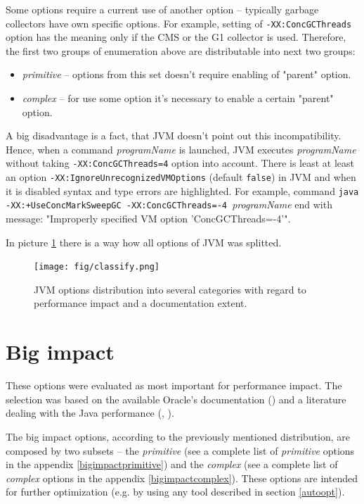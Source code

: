 \documentclass[
  digital, %
  oneside,
  notable, %
  nolof,     %
  nolot     %
]{fithesis3}
\begin{document}
Some options require a current use of another option -- typically garbage collectors have own specific options. For example, setting of \texttt{-XX:ConcGCThreads} option has the meaning only if the CMS or the G1 collector is used. Therefore, the first two groups of enumeration above are distributable into next two groups:
\begin{itemize}
	\item \textit{primitive} -- options from this set doesn't require enabling of "parent" option.
	\item \textit{complex} -- for use some option it's necessary to enable a certain "parent" option.
\end{itemize}
A big disadvantage is a fact, that JVM doesn't point out this incompatibility. Hence, when a command \texttt{} \textit{programName} is launched, JVM executes \textit{programName} without taking \texttt{-XX:ConcGCThreads=4} option into account. There is least at least an option \texttt{-XX:IgnoreUnrecognizedVMOptions} (default \texttt{false}) in JVM and when it is disabled syntax and type errors are highlighted. For example, command \texttt{java -XX:+UseConcMarkSweepGC -XX:ConcGCThreads=-4 }\textit{programName} end with message: "Improperly specified VM option 'ConcGCThreads=-4'".

In picture \ref{classify} there is a way how all options of JVM was splitted.

\begin{figure}[h]
	\centering
	\texttt{[image: fig/classify.png]}
	\caption{JVM options distribution into several categories with regard to performance impact and a documentation extent.}
	\label{classify}
\end{figure}

\section{Big impact}
These options were evaluated as most important for performance impact. The selection was based on the available Oracle's documentation (\cite{java}) and a literature dealing with the Java performance (\cite{scott}, \cite{hunt}).

The big impact options, according to the previously mentioned distribution, are composed by two subsets -- the \textit{primitive} (see a complete list of \textit{primitive} options in the appendix \ref{bigimpactprimitive}) and the \textit{complex} (see a complete list of \textit{complex} options in the appendix \ref{bigimpactcomplex}). These options are intended for further optimization (e.g. by using any tool described in section \ref{autoopt}).
\end{document}
